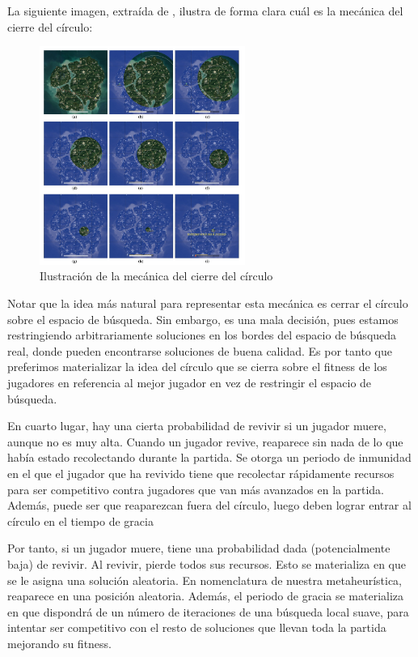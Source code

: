 \documentclass[11pt]{article}
\begin{document}
La siguiente imagen, extraída de \cite{other_paper:paper}, ilustra de forma clara cuál es la mecánica del cierre del círculo:

\begin{figure}[H]
    \centering
    \includegraphics[width=0.6\textwidth]{cierre_circulo}
    \caption{Ilustración de la mecánica del cierre del círculo}
\end{figure}

Notar que la idea más natural para representar esta mecánica es cerrar el círculo sobre el espacio de búsqueda. Sin embargo, es una mala decisión, pues estamos restringiendo arbitrariamente soluciones en los bordes del espacio de búsqueda real, donde pueden encontrarse soluciones de buena calidad. Es por tanto que preferimos materializar la idea del círculo que se cierra sobre el fitness de los jugadores en referencia al mejor jugador en vez de restringir el espacio de búsqueda.

En cuarto lugar, hay una cierta probabilidad de revivir si un jugador muere, aunque no es muy alta. Cuando un jugador revive, reaparece sin nada de lo que había estado recolectando durante la partida. Se otorga un periodo de inmunidad en el que el jugador que ha revivido tiene que recolectar rápidamente recursos para ser competitivo contra jugadores que van más avanzados en la partida. Además, puede ser que reaparezcan fuera del círculo, luego deben lograr entrar al círculo en el tiempo de gracia

Por tanto, si un jugador muere, tiene una probabilidad dada (potencialmente baja) de revivir. Al revivir, pierde todos sus recursos. Esto se materializa en que se le asigna una solución aleatoria. En nomenclatura de nuestra metaheurística, reaparece en una posición aleatoria. Además, el periodo de gracia se materializa en que dispondrá de un número de iteraciones de una búsqueda local suave,  para intentar ser competitivo con el resto de soluciones que llevan toda la partida mejorando su fitness.
\end{document}
